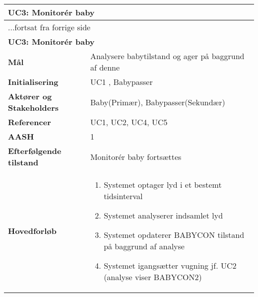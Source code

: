 \begin{center} \centering \label{kravspec:uc3}
	\begin{longtable}{|p{5cm}|p{9cm}|}  %
	\hline
		\multicolumn{2}{|l|}{\textbf{UC3: Monitorér baby}} \\\hline %
		\endfirsthead
		
		\multicolumn{2}{l}{...fortsat fra forrige side} \\ \hline %
		\multicolumn{2}{|l|}{\textbf{UC3: Monitorér baby}} \\\hline %
		\endhead	
		
		\textbf{Mål}							&Analysere babytilstand og ager på baggrund af denne	\\\hline
		\textbf{Initialisering}				&UC1	, Babypasser	\\\hline
		\textbf{Aktører og Stakeholders}		&Baby(Primær), Babypasser(Sekundær)		\\\hline 
		\textbf{Referencer}					&UC1, UC2, UC4, UC5		\\\hline
		\textbf{AASH}						&1		\\\hline
		\textbf{Efterfølgende tilstand}		&Monitorér baby fortsættes		\\\hline
		\textbf{Hovedforløb}					
			&\begin{enumerate}
					
				\item \label{kravspec:uc3_optagelse}Systemet optager lyd i et bestemt tidsinterval 				
				\newline [Und: \ref{kravspec:uc3_optagelse}.a Ingen optagelse]
				
				\item Systemet analyserer indsamlet lyd 
				
				\item Systemet opdaterer BABYCON tilstand på baggrund af analyse
				
				\item \label{kravspec:uc3_lydanalyse}Systemet igangsætter vugning jf. UC2 (analyse viser BABYCON2)			
				\newline [Und: \ref{kravspec:uc3_lydanalyse}.a Vugning allerede igang (forrige analyse viste BABYCON2)]
				\newline [Und: \ref{kravspec:uc3_lydanalyse}.b Analyse viser BABYCON3 (forrige analyse viste BABYCON2)]
				\newline [Und: \ref{kravspec:uc3_lydanalyse}.c Analyse viser BABYCON3 (forrige analyse viste BABYCON3)]
				\newline [Und: \ref{kravspec:uc3_lydanalyse}.d Analyse viser BABYCON1]
				

\end{enumerate}
\end{longtable}
\end{center}

